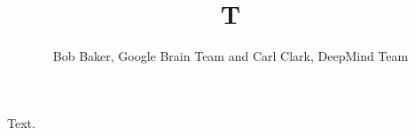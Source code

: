 \documentclass{article}
\begin{document}
\title{T}
\author{Bob Baker, Google Brain Team and Carl Clark, DeepMind Team}
\maketitle
Text.
\end{document}
